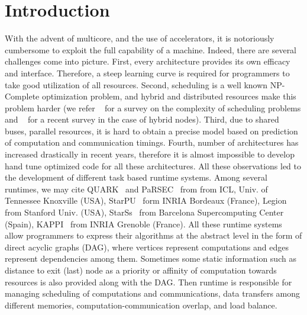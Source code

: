 \documentclass[sigconf]{acmart}
\begin{document}
	
	
	\maketitle
	
	\section{Introduction}
	\label{sec:intro}
	
	With the advent of multicore, and the use of accelerators, it is notoriously cumbersome to exploit the full capability of a machine. Indeed, there are several challenges come into picture. First, every architecture provides its own efficacy and interface. Therefore, a steep learning curve is required for programmers to take good utilization of all resources. Second, scheduling is a well known NP-Complete optimization problem, and hybrid and distributed resources make this problem harder (we refer ~\cite{webpagescheduling} for a survey on the complexity of scheduling problems and ~\cite{bleuse2015scheduling} for a recent survey in the case of hybrid nodes). Third, due to shared buses, parallel resources, it is hard to obtain a precise model based on prediction of computation and communication timings. Fourth, number of architectures has increased drastically in recent years, therefore it is almost impossible to develop hand tune optimized code for all these architectures. All these observations led to the development of different task based runtime systems. Among several runtimes, we may cite QUARK~\cite{YarKhan:2011:Quark:Manual} and PaRSEC~\cite{parsec} from from ICL, Univ. of Tennessee Knoxville (USA), StarPU~\cite{starpu} form INRIA Bordeaux (France), Legion~\cite{legion12} from Stanford Univ. (USA), StarSs~\cite{ompss} from Barcelona Supercomputing Center (Spain), KAPPI~\cite{kaapi} from INRIA Grenoble (France). All these runtime systems allow programmers to express their algorithms at the abstract level in the form of direct acyclic graphs (DAG), where vertices represent computations and edges represent dependencies among them. Sometimes some static information such as distance to exit (last) node as a priority or affinity of computation towards resources is also provided along with the DAG. Then runtime is responsible for managing scheduling of computations and communications, data transfers among different memories, computation-communication overlap, and load balance.
	
\end{document}
